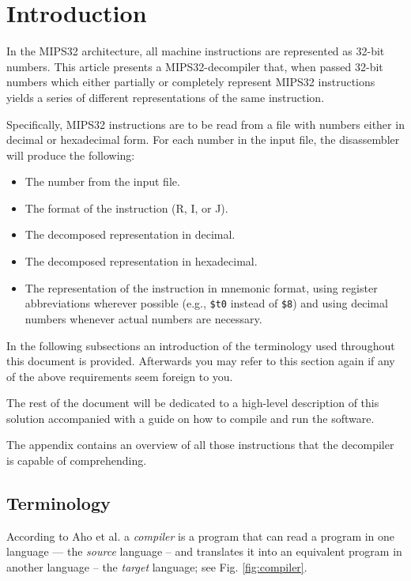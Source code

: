 \documentclass[a4paper]{article}
\begin{document}
\section{Introduction}

In the MIPS32 architecture, all machine instructions are represented
as 32-bit numbers. This article presents a MIPS32-decompiler that,
when passed 32-bit numbers which either partially or completely
represent MIPS32 instructions yields a series of different
representations of the same instruction.

Specifically, MIPS32 instructions are to be read from a file with
numbers either in decimal or hexadecimal form. For each number in the
input file, the disassembler will produce the following:

\begin{itemize}
  \item The number from the input file.
  \item The format of the instruction (R, I, or J).
  \item The decomposed representation in decimal.
  \item The decomposed representation in hexadecimal.
  \item The representation of the instruction in mnemonic format,
    using register abbreviations wherever possible (e.g.,
    \texttt{\$t0} instead of \texttt{\$8}) and using decimal numbers
    whenever actual numbers are necessary.
\end{itemize}

In the following subsections an introduction of the terminology used
throughout this document is provided. Afterwards you may refer to this
section again if any of the above requirements seem foreign to you.

The rest of the document will be dedicated to a high-level description
of this solution accompanied with a guide on how to compile and run
the software.

The appendix contains an overview of all those instructions that the
decompiler is capable of comprehending.
\subsection{Terminology}

According to Aho et al.  a \emph{compiler} is a program that
can read a program in one language --- the \emph{source} language --
and translates it into an equivalent program in another language --
the \emph{target} language; see Fig. \ref{fig:compiler}.
\end{document}
